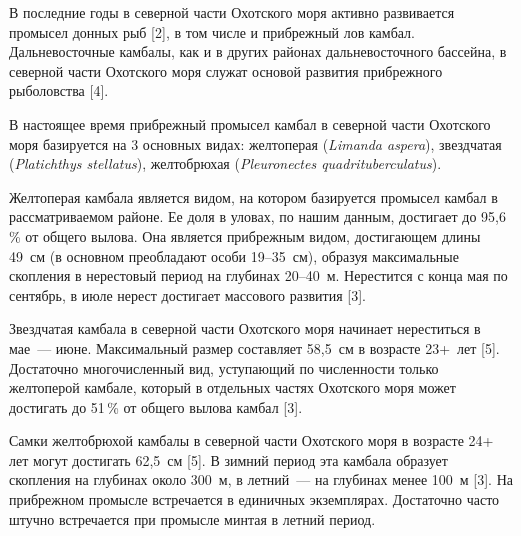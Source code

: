 



\makeProcTitleIVRazdel
{}



В последние годы в северной части Охотского моря активно развивается промысел донных рыб [2], в том числе и прибрежный лов камбал. Дальневосточные камбалы, как и в других районах дальневосточного бассейна, в северной части Охотского моря служат основой развития прибрежного рыболовства [4].

В настоящее время прибрежный промысел камбал в северной части Охотского моря базируется на 3 основных видах: желтоперая (\textit{Limanda aspera}), звездчатая (\textit{Platichthys stellatus}), желтобрюхая (\textit{Pleuronectes quad\-ri\-tu\-ber\-culatus}).

Желтоперая камбала является видом, на котором базируется промысел камбал в рассматриваемом районе. Ее доля в уловах, по нашим данным, достигает до 95,6\,\% от общего вылова. Она является прибрежным видом, достигающем длины 49~см (в основном преобладают особи 19--35~см), образуя максимальные скопления в нерестовый период на глубинах 20--40~м. Нерестится с конца мая по сентябрь, в июле нерест достигает массового развития [3].

Звездчатая камбала в северной части Охотского моря начинает нереститься в мае~--- июне. Максимальный размер составляет 58,5~см в возрасте 23+~лет [5]. Достаточно многочисленный вид, уступающий по численности только желтоперой камбале, который в отдельных частях Охотского моря может достигать до 51\,\% от общего вылова камбал [3].

Самки желтобрюхой камбалы в северной части Охотского моря в возрасте 24+ лет могут достигать 62,5~см [5]. В зимний период эта камбала образует скопления на глубинах около 300~м, в летний~--- на глубинах менее 100~м [3]. На прибрежном промысле встречается в единичных экземплярах. Достаточно часто штучно встречается при промысле минтая в летний период.

